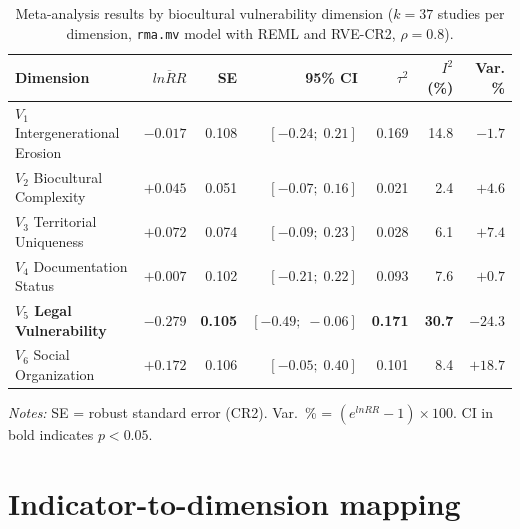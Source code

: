\documentclass[12pt,a4paper]{article}
\begin{document}
\begin{table}[H]
\caption{Meta-analysis results by biocultural vulnerability dimension ($k = 37$ studies per dimension, \texttt{rma.mv} model with REML and RVE-CR2, $\rho = 0.8$).}
\label{tab:meta-results}
\centering
\small
\begin{tabular}{lrrrrrr}
\toprule
\textbf{Dimension} & $\overline{lnRR}$ & \textbf{SE} & \textbf{95\% CI} & $\tau^2$ & $I^2$ (\%) & \textbf{Var. \%} \\
\midrule
$V_1$ Intergenerational Erosion    & $-0.017$ & 0.108 & $[-0.24;\; 0.21]$ & 0.169 & 14.8 & $-1.7$ \\
$V_2$ Biocultural Complexity       & $+0.045$ & 0.051 & $[-0.07;\; 0.16]$ & 0.021 &  2.4 & $+4.6$ \\
$V_3$ Territorial Uniqueness       & $+0.072$ & 0.074 & $[-0.09;\; 0.23]$ & 0.028 &  6.1 & $+7.4$ \\
$V_4$ Documentation Status         & $+0.007$ & 0.102 & $[-0.21;\; 0.22]$ & 0.093 &  7.6 & $+0.7$ \\
\textbf{$V_5$ Legal Vulnerability} & $\mathbf{-0.279}$ & \textbf{0.105} & $\mathbf{[-0.49;\; -0.06]}$ & \textbf{0.171} & \textbf{30.7} & $\mathbf{-24.3}$ \\
$V_6$ Social Organization          & $+0.172$ & 0.106 & $[-0.05;\; 0.40]$ & 0.101 &  8.4 & $+18.7$ \\
\bottomrule
\end{tabular}
\begin{flushleft}
\footnotesize \textit{Notes:} SE = robust standard error (CR2). Var.~\% = $(e^{lnRR} - 1) \times 100$.  CI in bold indicates $p < 0.05$.
\end{flushleft}
\end{table}

\newpage

\section{Indicator-to-dimension mapping}
\label{app:mapping}
\end{document}
